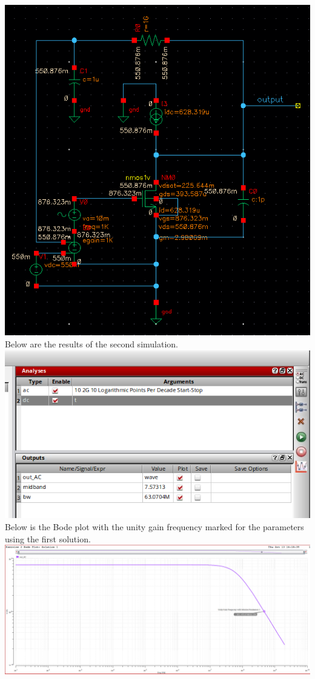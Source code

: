\documentclass[12pt, fleqn]{article}
\begin{document}
\includegraphics[scale=0.5, center]{schem3.PNG}\\[0.25cm]
Below are the results of the second simulation.\\[0.25cm]
\includegraphics[scale=0.55, center]{sim_res3.PNG}\\[0.25cm]
\newpage\noindent
Below is the Bode plot with the unity gain frequency marked for the parameters using the first solution.\\[0.25cm]
\includegraphics[scale=0.25, center]{bode2.PNG}\\[0.25cm]
\end{document}
